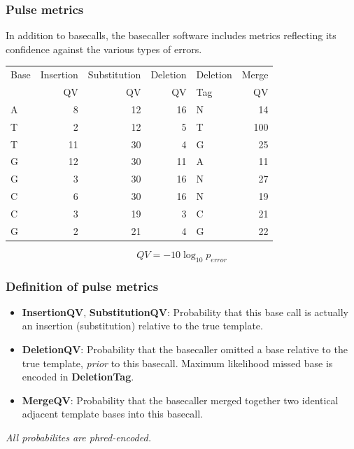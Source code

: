 \documentclass[serif,11pt]{beamer}
\begin{document}
\begin{frame}
\frametitle{Pulse metrics}
\label{sec-2-2}

   In addition to basecalls, the basecaller software includes metrics
   reflecting its confidence against the various types of errors.


\begin{center}
\begin{tabular}{lrrrlr}
 Base  &  Insertion  &  Substitution  &  Deletion  &  Deletion  &  Merge  \\
       &         QV  &            QV  &        QV  &  Tag       &     QV  \\
\hline
 A     &          8  &            12  &        16  &  N         &     14  \\
 T     &          2  &            12  &         5  &  T         &    100  \\
 T     &         11  &            30  &         4  &  G         &     25  \\
 G     &         12  &            30  &        11  &  A         &     11  \\
 G     &          3  &            30  &        16  &  N         &     27  \\
 C     &          6  &            30  &        16  &  N         &     19  \\
 C     &          3  &            19  &         3  &  C         &     21  \\
 G     &          2  &            21  &         4  &  G         &     22  \\
\end{tabular}
\end{center}



   $$QV = -10 \log_{10} p_{error}$$
\end{frame}
\begin{frame}
\frametitle{Definition of pulse metrics}
\label{sec-2-3}


\begin{itemize}
\item \textbf{InsertionQV}, \textbf{SubstitutionQV}: Probability that this base call
     is actually an insertion (substitution) relative to the true
     template.
\item \textbf{DeletionQV}: Probability that the basecaller omitted a base
     relative to the true template, \emph{prior} to this basecall.  Maximum
     likelihood missed base is encoded in \textbf{DeletionTag}.
\item \textbf{MergeQV}: Probability that the basecaller merged together two
     identical adjacent template bases into this basecall.
\end{itemize}

   \emph{All probabilites are phred-encoded.}
\end{frame}
\end{document}
